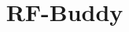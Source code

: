 \documentclass[10pt,emptycopyrightspace, letter]{IEEEtran}
\title{RF-Buddy}
\begin{document}
	
	\maketitle
	
	
		
	\balance
	
	
\end{document}

